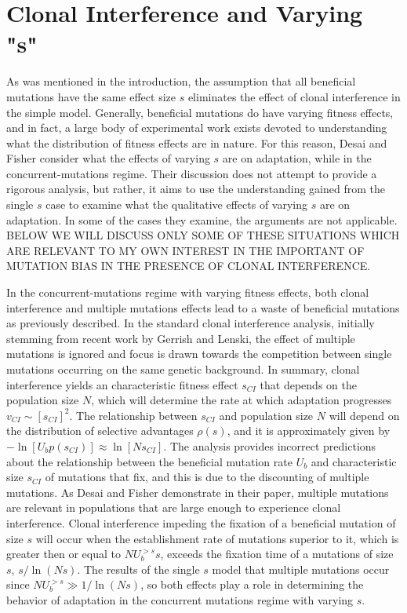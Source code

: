 \documentclass[12pt, two column]{article}
\begin{document}
\section*{Clonal Interference and Varying "s"}
As was mentioned in the introduction, the assumption that all beneficial mutations have the same effect size $s$ eliminates the effect of clonal interference in the simple model.  Generally, beneficial mutations do have varying fitness effects, and in fact, a large body of experimental work exists devoted to understanding what the distribution of fitness effects are in nature.  For this reason, Desai and Fisher consider what the effects of varying $s$ are on adaptation, while in the concurrent-mutations regime.  Their discussion does not attempt to provide a rigorous analysis, but rather, it aims to use the understanding gained from the single $s$ case to examine what the qualitative effects of varying $s$ are on adaptation.  In some of the cases they examine, the arguments are not applicable.  BELOW WE WILL DISCUSS ONLY SOME OF THESE SITUATIONS WHICH ARE RELEVANT TO MY OWN INTEREST IN THE IMPORTANT OF MUTATION BIAS IN THE PRESENCE OF CLONAL INTERFERENCE.

In the concurrent-mutations regime with varying fitness effects, both clonal interference and multiple mutations effects lead to a waste of beneficial mutations as previously described.  In the standard clonal interference analysis, initially stemming from recent work by Gerrish and Lenski, the effect of multiple mutations is ignored and focus is drawn towards the competition between single mutations occurring on the same genetic background.  In summary, clonal interference yields an characteristic fitness effect $s_{CI}$ that depends on the population size $N$, which will determine the rate at which adaptation progresses $v_{CI} \sim [s_{CI}]^2$.  The relationship between $s_{CI}$ and population size $N$ will depend on the distribution of selective advantages $\rho(s)$, and it is approximately given by $-\ln[U_b p(s_{CI})] \approx \ln[N s_{CI}]$.  The analysis provides incorrect predictions about the relationship between the beneficial mutation rate $U_b$ and characteristic size $s_{CI}$ of mutations that fix, and this is due to the discounting of multiple mutations.  As Desai and Fisher demonstrate in their paper, multiple mutations are relevant in populations that are large enough to experience clonal interference.  Clonal interference impeding the fixation of a beneficial mutation of size $s$ will occur when the establishment rate of mutations superior to it, which is greater then or equal to $NU_b^{>s}s$, exceeds the fixation time of a mutations of size $s$, $s/\ln(Ns)$.  The results of the single $s$ model that multiple mutations occur since $NU_b^{>s} \gg 1/\ln(Ns)$, so both effects play a role in determining the behavior of adaptation in the concurrent mutations regime with varying $s$.
\end{document}
